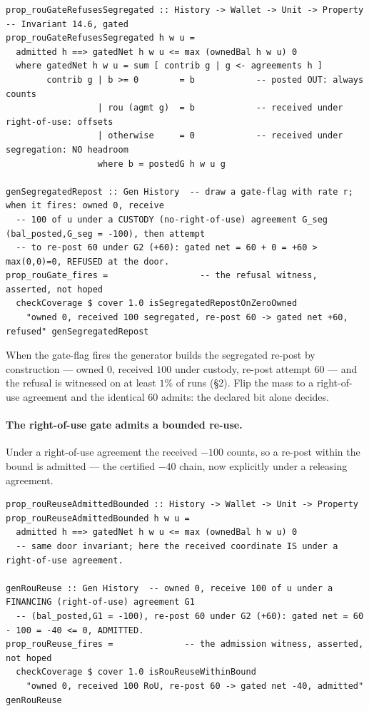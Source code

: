 \documentclass[11pt,a4paper]{article}
\begin{document}
\begin{lstlisting}
prop_rouGateRefusesSegregated :: History -> Wallet -> Unit -> Property  -- Invariant 14.6, gated
prop_rouGateRefusesSegregated h w u =
  admitted h ==> gatedNet h w u <= max (ownedBal h w u) 0
  where gatedNet h w u = sum [ contrib g | g <- agreements h ]
        contrib g | b >= 0        = b            -- posted OUT: always counts
                  | rou (agmt g)  = b            -- received under right-of-use: offsets
                  | otherwise     = 0            -- received under segregation: NO headroom
                  where b = postedG h w u g

genSegregatedRepost :: Gen History  -- draw a gate-flag with rate r; when it fires: owned 0, receive
  -- 100 of u under a CUSTODY (no-right-of-use) agreement G_seg (bal_posted,G_seg = -100), then attempt
  -- to re-post 60 under G2 (+60): gated net = 60 + 0 = +60 > max(0,0)=0, REFUSED at the door.
prop_rouGate_fires =                  -- the refusal witness, asserted, not hoped
  checkCoverage $ cover 1.0 isSegregatedRepostOnZeroOwned
    "owned 0, received 100 segregated, re-post 60 -> gated net +60, refused" genSegregatedRepost
\end{lstlisting}

When the gate-flag fires the generator builds the segregated re-post by construction ---
owned $0$, received $100$ under custody, re-post attempt $60$ --- and the refusal is
witnessed on at least $1\%$ of runs (\S 2). Flip the mass to a right-of-use agreement and
the identical $60$ admits: the declared bit alone decides.

\paragraph{The right-of-use gate admits a bounded re-use.}
Under a right-of-use agreement the received $-100$ counts, so a re-post within the bound
is admitted --- the certified $-40$ chain, now explicitly under a releasing agreement.

\begin{lstlisting}
prop_rouReuseAdmittedBounded :: History -> Wallet -> Unit -> Property
prop_rouReuseAdmittedBounded h w u =
  admitted h ==> gatedNet h w u <= max (ownedBal h w u) 0
  -- same door invariant; here the received coordinate IS under a right-of-use agreement.

genRouReuse :: Gen History  -- owned 0, receive 100 of u under a FINANCING (right-of-use) agreement G1
  -- (bal_posted,G1 = -100), re-post 60 under G2 (+60): gated net = 60 - 100 = -40 <= 0, ADMITTED.
prop_rouReuse_fires =              -- the admission witness, asserted, not hoped
  checkCoverage $ cover 1.0 isRouReuseWithinBound
    "owned 0, received 100 RoU, re-post 60 -> gated net -40, admitted" genRouReuse
\end{lstlisting}
\end{document}
